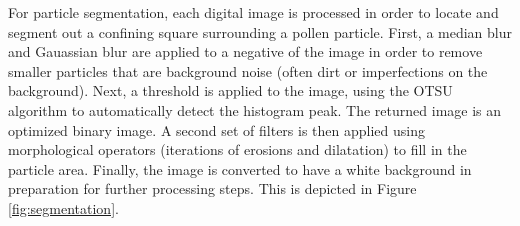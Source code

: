 For particle segmentation, each digital image is processed in order to locate and segment out a confining square surrounding a pollen particle. First, a median blur and Gauassian blur are applied to a negative of the image in order to remove smaller particles that are background noise (often dirt or imperfections on the background). 
Next, a threshold is applied to the image, using the OTSU algorithm to automatically detect the histogram peak. The returned image is an optimized binary image. A second set of filters is then applied using morphological operators (iterations of erosions and dilatation) to fill in the particle area. Finally, the image is converted to have a white background in preparation for further processing steps. This is depicted in Figure \ref{fig:segmentation}.

  
  
  
  